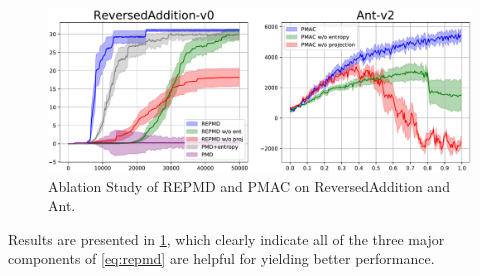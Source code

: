 \begin{figure}[t]
\begin{center}
\includegraphics[width=0.5\linewidth]{./ablation-results.pdf}
\end{center}
\caption{Ablation Study of REPMD and PMAC %
on ReversedAddition and Ant. }
\label{fig:ablation}
\end{figure}

Results are presented in \cref{fig:ablation}, which clearly indicate all of the three major components of \cref{eq:repmd} are helpful for yielding better performance. 

